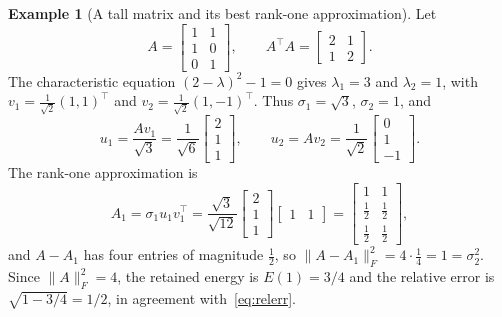 \documentclass[12pt,a4paper]{report}
\newcommand{\norm}[1]{\lVert #1\rVert}
\newcommand{\T}{^{\top}}
\theoremstyle{plain}
\theoremstyle{definition}
\theoremstyle{remark}
\theoremstyle{definition}
\newtheorem{example}{Example}[chapter]
\begin{document}
\begin{example}[A tall matrix and its best rank-one approximation]\label{ex:tall}
Let
\[
A=\begin{bmatrix}1&1\\1&0\\0&1\end{bmatrix},\qquad A\T A=\begin{bmatrix}2&1\\1&2\end{bmatrix}.
\]
The characteristic equation $(2-\lambda)^2-1=0$ gives $\lambda_1=3$ and $\lambda_2=1$, with $v_1=\tfrac1{\sqrt2}(1,1)\T$ and $v_2=\tfrac1{\sqrt2}(1,-1)\T$. Thus $\sigma_1=\sqrt3$, $\sigma_2=1$, and
\[
u_1=\frac{Av_1}{\sqrt3}=\frac1{\sqrt6}\begin{bmatrix}2\\1\\1\end{bmatrix},\qquad
u_2=Av_2=\frac1{\sqrt2}\begin{bmatrix}0\\1\\-1\end{bmatrix}.
\]
The rank-one approximation is
\[
A_1=\sigma_1u_1v_1\T=\frac{\sqrt3}{\sqrt{12}}\begin{bmatrix}2\\1\\1\end{bmatrix}\begin{bmatrix}1&1\end{bmatrix}=\begin{bmatrix}1&1\\\tfrac12&\tfrac12\\\tfrac12&\tfrac12\end{bmatrix},
\]
and $A-A_1$ has four entries of magnitude $\tfrac12$, so $\norm{A-A_1}_F^2=4\cdot\tfrac14=1=\sigma_2^2$. Since $\norm{A}_F^2=4$, the retained energy is $E(1)=3/4$ and the relative error is $\sqrt{1-3/4}=1/2$, in agreement with~\eqref{eq:relerr}.
\end{example}
\end{document}
